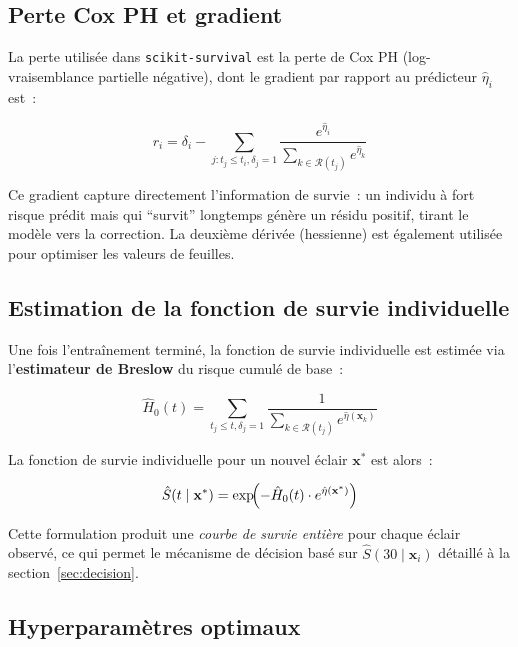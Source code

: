 \documentclass[a4paper,11pt]{article}
\newcommand{\Ssurvival}{S}
\begin{document}
\subsection{Perte Cox PH et gradient}

La perte utilisée dans \texttt{scikit-survival} est la perte de Cox PH (log-vraisemblance
partielle négative), dont le gradient par rapport au prédicteur $\hat{\eta}_i$ est~:

\begin{equation}
  r_i = \delta_i - \sum_{j : t_j \leq t_i, \delta_j = 1}
  \frac{e^{\hat{\eta}_i}}{\sum_{k \in \mathcal{R}(t_j)} e^{\hat{\eta}_k}}
  \label{eq:gradient}
\end{equation}

Ce gradient capture directement l'information de survie~: un individu à fort risque prédit mais
qui ``survit'' longtemps génère un résidu positif, tirant le modèle vers la correction. La
deuxième dérivée (hessienne) est également utilisée pour optimiser les valeurs de feuilles.

\subsection{Estimation de la fonction de survie individuelle}

Une fois l'entraînement terminé, la fonction de survie individuelle est estimée via
l'\textbf{estimateur de Breslow} du risque cumulé de base~:

\begin{equation}
  \hat{H}_0(t) = \sum_{t_j \leq t, \delta_j=1}
  \frac{1}{\sum_{k \in \mathcal{R}(t_j)} e^{\hat{\eta}(\mathbf{x}_k)}}
  \label{eq:breslow}
\end{equation}

La fonction de survie individuelle pour un nouvel éclair $\mathbf{x}^*$ est alors~:

\begin{equation}
  \hat{\Ssurvival}(t \mid \mathbf{x}^*) = \exp\!\Bigl(-\hat{H}_0(t) \cdot
  e^{\hat{\eta}(\mathbf{x}^*)}\Bigr)
  \label{eq:survival_individual}
\end{equation}

Cette formulation produit une \emph{courbe de survie entière} pour chaque éclair observé, ce qui
permet le mécanisme de décision basé sur $\hat{\Ssurvival}(30 \mid \mathbf{x}_i)$ détaillé à la
section~\ref{sec:decision}.

\subsection{Hyperparamètres optimaux}
\end{document}
